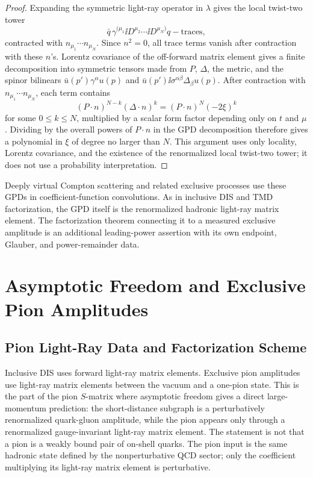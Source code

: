 \begin{proof}
Expanding the symmetric light-ray operator in \(\lambda\) gives the local
twist-two tower
\[
  \bar q\,\gamma^{(\mu_1}
  \ii D^{\mu_2}\cdots\ii D^{\mu_N)}q-\text{traces},
\]
contracted with \(n_{\mu_1}\cdots n_{\mu_N}\).  Since \(n^2=0\), all trace
terms vanish after contraction with these \(n\)'s.  Lorentz covariance of the
off-forward matrix element gives a finite decomposition into symmetric tensors
made from \(P\), \(\Delta\), the metric, and the spinor bilinears
\(\bar u(p')\gamma^\alpha u(p)\) and
\(\bar u(p')\ii\sigma^{\alpha\beta}\Delta_\beta u(p)\).  After contraction
with \(n_{\mu_1}\cdots n_{\mu_N}\), each term contains
\[
  (P\cdot n)^{N-k}(\Delta\cdot n)^k
  =
  (P\cdot n)^N(-2\xi)^k
\]
for some \(0\le k\le N\), multiplied by a scalar form factor depending only on
\(t\) and \(\mu\).  Dividing by the overall powers of \(P\cdot n\) in the GPD
decomposition therefore gives a polynomial in \(\xi\) of degree no larger than
\(N\).  This argument uses only locality, Lorentz covariance, and the
existence of the renormalized local twist-two tower; it does not use a
probability interpretation.
\end{proof}

Deeply virtual Compton scattering and related exclusive processes use these
GPDs in coefficient-function convolutions.  As in inclusive DIS and TMD
factorization, the GPD itself is the renormalized hadronic light-ray matrix
element.  The factorization theorem connecting it to a measured exclusive
amplitude is an additional leading-power assertion with its own endpoint,
Glauber, and power-remainder data.

\section{Asymptotic Freedom and Exclusive Pion Amplitudes}
\label{sec:qcd-exclusive-pion-asymptotic-freedom}

\subsection{Pion Light-Ray Data and Factorization Scheme}
\label{subsec:qcd-pion-light-ray-factorization-scheme}

Inclusive DIS uses forward light-ray matrix elements.  Exclusive pion
amplitudes use light-ray matrix elements between the vacuum and a one-pion
state.  This is the part of the pion \(S\)-matrix where asymptotic freedom
gives a direct large-momentum prediction: the short-distance subgraph is a
perturbatively renormalized quark-gluon amplitude, while the pion appears only
through a renormalized gauge-invariant light-ray matrix element.  The statement
is not that a pion is a weakly bound pair of on-shell quarks.  The pion input is
the same hadronic state defined by the nonperturbative QCD sector; only the
coefficient multiplying its light-ray matrix element is perturbative.


